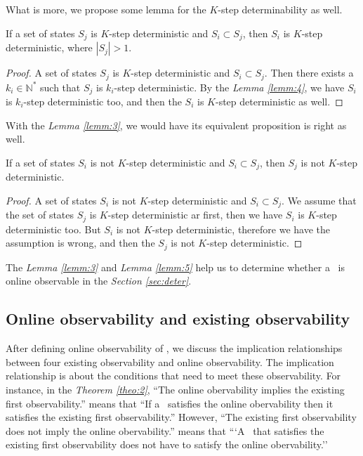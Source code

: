 What is more, we propose some lemma for the $K$-step determinability as well.
\begin{lemma}
 If a set of states $S_j$ is $K$-step deterministic and $S_i\subset S_j$, then $S_i$ is $K$-step deterministic, where $|S_j|>1$.
\label{lemm:3}
\end{lemma}
\begin{proof}A set of states $S_j$ is $K$-step deterministic and $S_i\subset S_j$. Then there exists a $k_i\in \mathbb{N}^*$ such that $S_j$ is $k_i$-step deterministic. By the {\em Lemma \ref{lemm:4}}, we have $S_i$ is $k_i$-step deterministic too, and then the $S_i$ is $K$-step deterministic as well.
\end{proof}

With the {\em Lemma \ref{lemm:3}}, we would have its equivalent proposition is right as well.
\begin{lemma}
 If a set of states $S_i$ is not $K$-step deterministic and $S_i\subset S_j$, then $S_j$ is not $K$-step deterministic. 
  \label{lemm:5}
\end{lemma}
\begin{proof}
A set of states $S_i$ is not $K$-step deterministic and $S_i\subset S_j$. We assume that the set of states $S_j$ is $K$-step deterministic ar first, then we have $S_i$ is $K$-step deterministic too. But $S_i$ is not $K$-step deterministic, therefore we have the assumption is wrong, and then the $S_j$ is not $K$-step deterministic.
\end{proof}

The {\em Lemma \ref{lemm:3}} and {\em Lemma \ref{lemm:5}} help us to determine whether a \BCN\ is online observable in the {\em Section \ref{sec:deter}}.
\subsection{Online observability and existing observability}
After defining online observability of \BCNs, we discuss the implication relationships between four existing observability and online observability. The implication relationship is about the conditions that need to meet these observability. For instance, in the {\em Theorem \ref{theo:2}}, ``The online obervability implies the existing first observability.'' means that ``If a \BCN\ satisfies the online obervability then it satisfies the existing first observability.'' However, ``The existing first observability does not imply the online obervability.'' means that ```A \BCN\ that satisfies the existing first observability does not have to satisfy the online obervability.''

